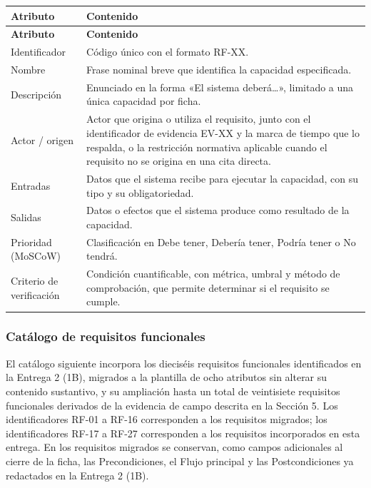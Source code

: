 \documentclass[12pt,a4paper]{article}
\begin{document}
\begin{center}
\begin{longtable}{|p{3.5cm}|p{10.7cm}|}
\hline
\textbf{Atributo} & \textbf{Contenido} \\
\hline
\endfirsthead
\hline
\textbf{Atributo} & \textbf{Contenido} \\
\hline
\endhead
\hline
\endfoot
\hline
\endlastfoot
Identificador & Código único con el formato RF-XX. \\
\hline
Nombre & Frase nominal breve que identifica la capacidad especificada. \\
\hline
Descripción & Enunciado en la forma «El sistema deberá\ldots», limitado a una única capacidad por ficha. \\
\hline
Actor / origen & Actor que origina o utiliza el requisito, junto con el identificador de evidencia EV-XX y la marca de tiempo que lo respalda, o la restricción normativa aplicable cuando el requisito no se origina en una cita directa. \\
\hline
Entradas & Datos que el sistema recibe para ejecutar la capacidad, con su tipo y su obligatoriedad. \\
\hline
Salidas & Datos o efectos que el sistema produce como resultado de la capacidad. \\
\hline
Prioridad (MoSCoW) & Clasificación en Debe tener, Debería tener, Podría tener o No tendrá. \\
\hline
Criterio de verificación & Condición cuantificable, con métrica, umbral y método de comprobación, que permite determinar si el requisito se cumple. \\
\hline
\end{longtable}
\label{tab:plantilla-rf}
\end{center}

\subsubsection{Catálogo de requisitos funcionales}
\label{sec:catalogo-rf}

El catálogo siguiente incorpora los dieciséis requisitos funcionales identificados en la Entrega 2 (1B), migrados a la plantilla de ocho atributos sin alterar su contenido sustantivo, y su ampliación hasta un total de veintisiete requisitos funcionales derivados de la evidencia de campo descrita en la Sección 5. Los identificadores RF-01 a RF-16 corresponden a los requisitos migrados; los identificadores RF-17 a RF-27 corresponden a los requisitos incorporados en esta entrega. En los requisitos migrados se conservan, como campos adicionales al cierre de la ficha, las Precondiciones, el Flujo principal y las Postcondiciones ya redactados en la Entrega 2 (1B).
\end{document}
